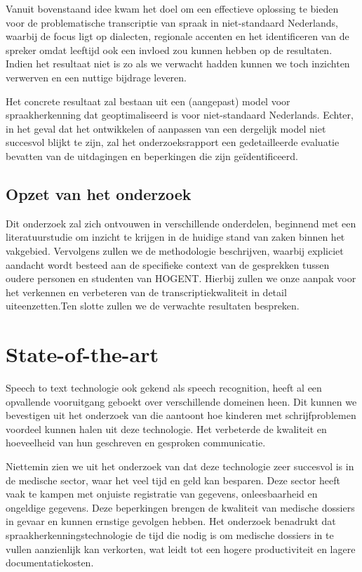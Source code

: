 Vanuit bovenstaand idee kwam het doel om een effectieve oplossing te bieden voor de problematische transcriptie van spraak in niet-standaard Nederlands, waarbij de focus ligt op dialecten, regionale accenten en het identificeren van de spreker omdat leeftijd ook een invloed zou kunnen hebben op de resultaten. Indien het resultaat niet is zo als we verwacht hadden kunnen we toch inzichten verwerven en een nuttige bijdrage leveren.

Het concrete resultaat zal bestaan uit een (aangepast) model voor spraakherkenning dat geoptimaliseerd is voor niet-standaard Nederlands. Echter, in het geval dat het ontwikkelen of aanpassen van een dergelijk model niet succesvol blijkt te zijn, zal het onderzoeksrapport een gedetailleerde evaluatie bevatten van de uitdagingen en beperkingen die zijn geïdentificeerd.

\subsection{Opzet van het onderzoek}
Dit onderzoek zal zich ontvouwen in verschillende onderdelen, beginnend met een literatuurstudie om inzicht te krijgen in de huidige stand van zaken binnen het vakgebied.   Vervolgens zullen we de methodologie beschrijven, waarbij expliciet aandacht wordt besteed aan de specifieke context van de gesprekken tussen oudere personen en studenten van HOGENT. Hierbij zullen we onze aanpak voor het verkennen en verbeteren van de transcriptiekwaliteit in detail uiteenzetten.Ten slotte zullen we de verwachte resultaten bespreken.




\section{State-of-the-art}%
\label{sec:state-of-the-art}

Speech to text technologie ook gekend als speech recognition, heeft al een opvallende vooruitgang geboekt over verschillende domeinen heen. Dit kunnen we bevestigen uit het onderzoek van \cite{Kambouri2023} die aantoont hoe kinderen met schrijfproblemen voordeel kunnen halen uit deze technologie. Het verbeterde de kwaliteit en hoeveelheid van hun geschreven en gesproken communicatie.

Niettemin zien we uit het onderzoek van \cite{ajami2016use} dat deze technologie zeer succesvol is in de medische sector, waar het veel tijd en geld kan besparen. Deze sector heeft vaak te kampen met onjuiste registratie van gegevens, onleesbaarheid en ongeldige gegevens. Deze beperkingen brengen de kwaliteit van medische dossiers in gevaar en kunnen ernstige gevolgen hebben. Het onderzoek benadrukt dat spraakherkenningstechnologie de tijd die nodig is om medische dossiers in te vullen aanzienlijk kan verkorten, wat leidt tot een hogere productiviteit en lagere documentatiekosten.

